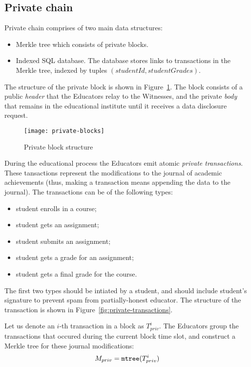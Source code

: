 \subsection{Private chain}

Private chain comprises of two main data structures:
\begin{itemize}
\item Merkle tree which consists of private blocks.
\item Indexed SQL database. The database stores links to transactions in the Merkle tree, indexed by tuples $(studentId, studentGrades)$.
\end{itemize}

The structure of the private block is shown in Figure~\ref{fig:privateblocks}. The block consists of a public \textit{header} that the Educators relay to the Witnesses, and the private \textit{body} that remains in the educational institute until it receives a data disclosure request.

\begin{figure}[ht]
\centering
\texttt{[image: private-blocks]}
\caption{Private block structure}
\label{fig:privateblocks}
\end{figure}

During the educational process the Educators emit atomic \textit{private transactions}. These tansactions represent the modifications to the journal of academic achievements (thus, making a transaction means appending the data to the journal). The transactions can be of the following types:
\begin{itemize}
\item student enrolls in a course;
\item student gets an assignment;
\item student submits an assignment;
\item student gets a grade for an assignment;
\item student gets a final grade for the course.
\end{itemize}

The first two types should be intiated by a student, and should include student's signature to prevent spam from partially-honest educator.
The structure of the transaction is shown in Figure~\ref{fig:private-transactions}.

Let us denote an $i$-th transaction in a block as $T_{priv}^i$. The Educators group the transactions that occured during the current block time slot, and construct a Merkle tree \cite{merkle1989certified} for these journal modifications:
\begin{equation}
M_{priv} = \mathtt{mtree}(T_{priv}^i)
\end{equation}

